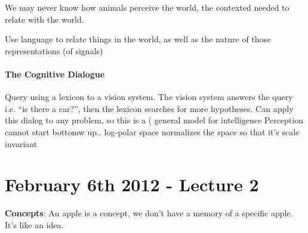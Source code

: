 We may never know how animals perceive the world, the contexted needed
to relate with the world. 

Use language to relate things in the world, as well as the nature of
those representations (of signals)

\paragraph{The Cognitive Dialogue}

Query using a lexicon to a vision system. The vision system answers
the query i.e. ``is there a car?'', then the lexicon searches for more
hypotheses. 
Can apply this dialog to any problem, so this is a ( general model for
intelligence
Perception cannot start bottomw up..
log-polar space normalizes the space so that it's scale invariant

\section{February 6th 2012 - Lecture 2}
\label{sec:lecture-2}
\textbf{Concepts}: An apple is a concept, we don't have a memory of a
specific apple. It's like an idea.


 
